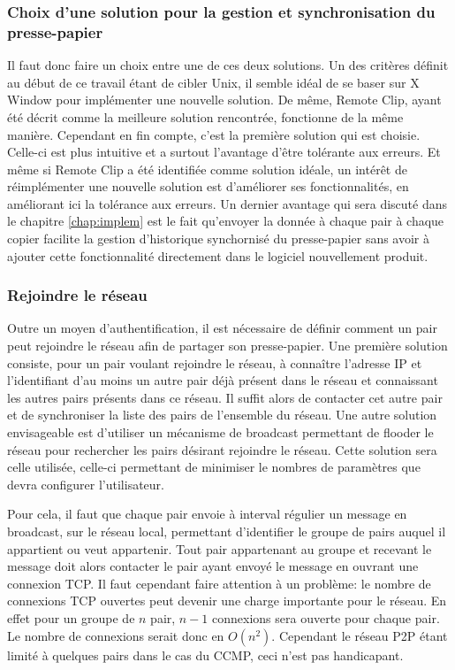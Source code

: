 \subsubsection{Choix d'une solution pour la gestion et
synchronisation du presse-papier}
Il faut donc faire un choix entre une de ces deux solutions. Un des critères
définit au début de ce travail étant de cibler Unix, il semble idéal de se
baser sur X Window pour implémenter une nouvelle solution. De même, Remote
Clip, ayant été décrit comme la meilleure solution rencontrée, fonctionne
de la même manière. Cependant en fin compte, c'est la première solution qui
est choisie. Celle-ci est plus intuitive et a surtout l'avantage d'être
tolérante aux erreurs. Et même si Remote Clip a été identifiée comme
solution idéale, un intérêt de réimplémenter une nouvelle solution est
d'améliorer ses fonctionnalités, en améliorant ici la tolérance aux erreurs.
Un dernier avantage qui sera discuté dans le chapitre \ref{chap:implem}
est le fait qu'envoyer la donnée à chaque pair à chaque copier facilite
la gestion d'historique synchornisé du presse-papier sans avoir à ajouter
cette fonctionnalité directement dans le logiciel nouvellement produit.

\subsubsection{Rejoindre le réseau}
Outre un moyen d'authentification, il est nécessaire de définir comment
un pair peut rejoindre le réseau afin de partager son presse-papier.
Une première solution consiste, pour un pair voulant
rejoindre le réseau, à connaître l'adresse IP et l'identifiant d'au moins un
autre pair déjà présent dans le réseau et connaissant les autres pairs présents
dans ce réseau. Il suffit alors de contacter cet autre pair et de synchroniser
la  liste des pairs de l'ensemble du réseau. Une autre solution envisageable
est d'utiliser un mécanisme de broadcast permettant de flooder le réseau pour
rechercher les pairs désirant rejoindre le réseau. Cette solution sera celle
utilisée, celle-ci permettant de minimiser le nombres de paramètres que devra
configurer l'utilisateur.

Pour cela, il faut que chaque pair envoie à interval régulier un message
en broadcast, sur le réseau local, permettant d'identifier le groupe de pairs
auquel il appartient ou veut appartenir. Tout pair appartenant au groupe et
recevant le message doit alors contacter le pair ayant envoyé le message en
ouvrant une connexion TCP. Il faut cependant faire attention à un
problème: le nombre de connexions TCP ouvertes peut devenir une charge
importante pour le réseau. En effet pour un groupe de $n$ pair, $n-1$
connexions sera ouverte pour chaque pair. Le nombre de connexions serait donc
en $O(n^2)$. Cependant le réseau P2P étant limité à quelques pairs dans le
cas du CCMP, ceci n'est pas handicapant.

